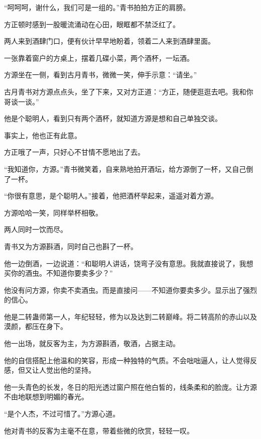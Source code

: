\begin{this_body}
“呵呵呵，谢什么，我们可是一组的。”青书拍拍方正的肩膀。

方正顿时感到一股暖流涌动在心田，眼眶都不禁泛红了。

两人来到酒肆门口，便有伙计早早地盼着，领着二人来到酒肆里面。

一张靠着窗户的方桌上，摆着几碟小菜，两个酒杯，一坛酒。

方源坐在一侧，看到古月青书，微微一笑，伸手示意：“请坐。”

古月青书对方源点点头，坐了下来，又对方正道：“方正，随便逛逛去吧。我和你哥谈一谈。”

他是个聪明人，看到只有两个酒杯，就知道方源是想和自己单独交谈。

事实上，他也正有此意。

方正哦了一声，只好心不甘情不愿地出了去。

“我知道你，方源。”青书微笑着，自来熟地拍开酒坛，给方源倒了一杯，又自己倒了一杯。

“你很有意思，是个聪明人。”接着，他把酒杯举起来，遥遥对着方源。

方源哈哈一笑，同样举杯相敬。

两人同时一饮而尽。

青书又为方源斟酒，同时自己也斟了一杯。

他一边倒酒，一边说道：“和聪明人讲话，饶弯子没有意思。我就直接说了，我想买你的酒虫。不知道你要卖多少？”

他没有问方源，你卖不卖酒虫。而是直接问——不知道你要卖多少。显示出了强烈的信心。

他是二转蛊师第一人，年纪轻轻，修为以及达到二转巅峰。将二转高阶的赤山以及漠颜，都压在身下。

他一出场，就反客为主，为方源斟酒，敬酒，占据主动。

他的自信搭配上他温和的笑容，形成一种独特的气质。不会咄咄逼人，让人觉得反感，但又让人觉出他的坚持。

他一头青色的长发，冬日的阳光透过窗户照在他白皙的，线条柔和的脸庞。让方源不由地联想到明媚的春光。

“是个人杰，不过可惜了。”方源心道。

他对青书的反客为主毫不在意，带着些微的欣赏，轻轻一叹。

\end{this_body}

